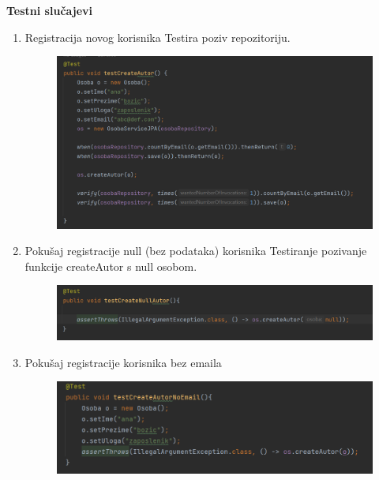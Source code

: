 			\textbf{Testni slučajevi} 
			\begin{enumerate}
				\item Registracija novog korisnika\newline
				Testira poziv repozitoriju.
				\begin{figure}[H]
					\includegraphics[scale=0.30]{slike/deploy/backTest1.png}
					\centering
					\label{fig:promjene1}
				\end{figure}
				
				\item Pokušaj registracije null (bez podataka) korisnika\newline
				Testiranje pozivanje funkcije createAutor s null osobom.
				\begin{figure}[H]
					\includegraphics[scale=0.30]{slike/deploy/backTest2.png}
					\centering
					\label{fig:promjene2}
				\end{figure}
				
				\item Pokušaj registracije korisnika bez emaila\newline
				\begin{figure}[H]
					\includegraphics[scale=0.30]{slike/deploy/backTest3.png}
					\centering
					\label{fig:promjene3}
				\end{figure}
				

\end{enumerate}
